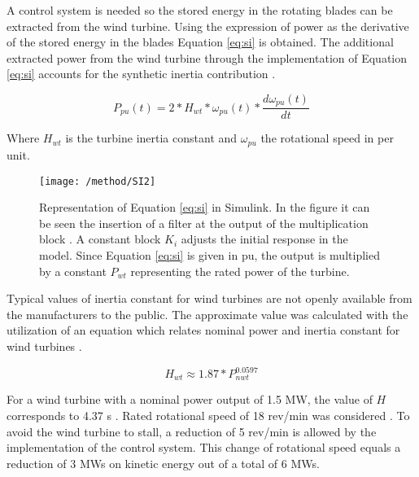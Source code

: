 A control system is needed so the stored energy in the rotating blades can be extracted from the wind turbine. Using the expression of power as the derivative of the stored energy in the blades Equation \eqref{eq:si} is obtained. The additional extracted power from the wind turbine through the implementation of Equation \eqref{eq:si} accounts for the synthetic inertia contribution \cite{NREL.2012}.

\begin{equation}
\label{eq:si}
P_{pu}(t)=2*H_{wt}*\omega_{pu}(t)*\dfrac{d\omega_{pu}(t)}{dt}
\end{equation}


Where $H_{wt}$ is the turbine inertia constant and $\omega_{pu}$ the rotational speed in per unit.

\begin{figure}[h]
	\centering
	\texttt{[image: /method/SI2]}
	\caption{Representation of Equation \eqref{eq:si} in Simulink. In the figure it can be seen the insertion of a filter at the output of the multiplication block \cite{GeneralElectricInternational.2013, nesje2015need}. A constant block $ K_i $ adjusts the initial response in the model. Since Equation \eqref{eq:si} is given in pu, the output is multiplied by a constant $ P_{wt} $ representing the rated power of the turbine.}
	\label{fig:synthetic}
\end{figure}

Typical values of inertia constant for wind turbines are not openly available from the manufacturers to the public. The approximate value was calculated with the utilization of an equation which relates nominal power and inertia constant for wind turbines \cite{GonzalezRodriguez.2007}.

\begin{equation}
\label{eq:wtinertia}
H_{wt}\approx1.87*P_{nwt}^{0.0597}
\end{equation}


For a wind turbine with a nominal power output of 1.5 MW, the value of $ H $ corresponds to 4.37 s \cite{Wu.2013}. Rated rotational speed of 18 rev/min was considered \cite{Wu.2013}. To avoid the wind turbine to stall, a reduction of 5 rev/min is allowed by the implementation of the control system. This change of rotational speed equals a reduction of 3 MWs on kinetic energy out of a total of 6 MWs.

